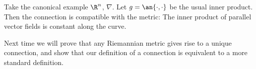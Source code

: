 \begin{ex}
Take the canonical example $\R^n$, $\nabla$. Let $g=\an{\cdot,\cdot}$ be the usual inner product. Then the connection is compatible with the metric:
The inner product of parallel vector fields is constant along the curve. 
\end{ex}

Next time we will prove that any Riemannian metric gives rise to a unique connection, and show that our definition of a connection is equivalent to a more standard definition.